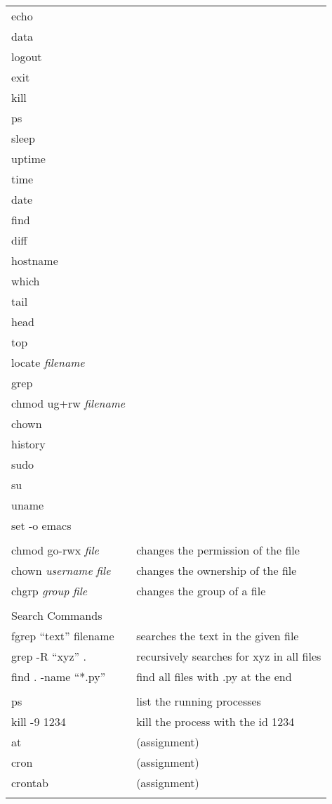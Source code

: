 \begin{center}
\begin{longtable}{|p{4cm}|p{8cm}|}
  echo & \\
  data & \\
  logout & \\
  exit & \\
  kill & \\
  ps & \\
  sleep & \\
  uptime & \\
  time & \\
  date & \\
  find & \\
  diff & \\
  hostname & \\
  which & \\
  tail & \\
  head & \\
  top & \\
  locate \textit{filename} & \\
  grep & \\
  chmod ug+rw \textit{filename} & \\
  chown & \\
  history & \\
  sudo & \\
  su & \\
  uname & \\
  set -o emacs & \\
  & \\
  
  chmod go-rwx \textit{file} & changes the permission of the file \\
  chown \textit{username} \textit{file} & changes the ownership of the file \\
  chgrp \textit{group} \textit{file} & changes the group of a file\\
  & \\

  \hline
  \multicolumn{2}{|l|}{\cellcolor{blue!15} Search Commands}\\
  \hline
  fgrep ``text'' filename &  searches the text in the given file \\
  grep -R ``xyz'' . & recursively searches for xyz in all files \\
  find . -name ``*.py'' &  find all files with .py at the end \\
  & \\

  ps & list the running processes \\
  kill -9 1234 & kill the process with the id 1234 \\
  at &  (assignment) \\
  cron &  (assignment) \\
  crontab &  (assignment) \\
  & \\


\end{longtable}
\end{center}
